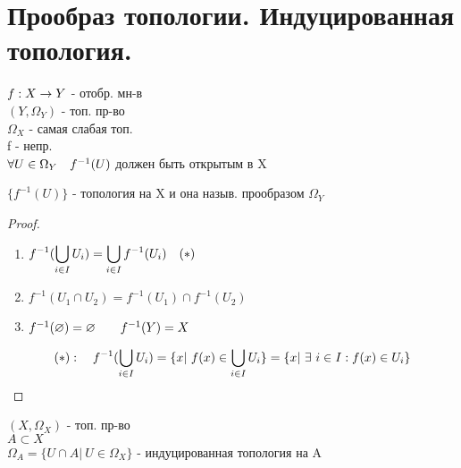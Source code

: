 \documentclass[geometry.tex]{subfiles}
\begin{document}
  \section{Прообраз топологии. Индуцированная топология.}

  \begin{definition}
      $f: X \rightarrow Y$ - отобр. мн-в\\
      $(Y, \Omega_Y)$ - топ. пр-во\\
      $\Omega_X$ - самая слабая топ.\\
      f - непр.\\
      $\forall U \in \Omega_Y \quad f^{-1}(U)$ должен быть открытым в X
  \end{definition}
  \begin{theorem}
      $\{f^{-1}(U)\}$ - топология на X и она назыв. прообразом $\Omega_Y$
  \end{theorem}

  \begin{proof}
      \begin{enumerate}
          \item $\displaystyle f^{-1}(\bigcup_{i \in I} U_i) = \bigcup_{i \in I} f^{-1}(U_i) \quad (*)$
          \item $f^{-1}(U_1 \cap U_2) = f^{-1}(U_1) \cap f^{-1}(U_2)$
          \item $f^{-1}(\varnothing) = \varnothing \quad\quad f^{-1}(Y) = X$
      \end{enumerate}
      \[(*): \quad f^{-1}(\bigcup_{i \in I} U_i) = \{x | \ f(x) \in \bigcup_{i \in I} U_i\} =
      \{x | \ \exists \  i \in I: f(x) \in U_i\}\]
  \end{proof}

  \begin{definition}
      $(X, \Omega_X)$ - топ. пр-во\\
      $A \subset X$\\
      $\Omega_A = \{U \cap A | \ U \in \Omega_X\}$ - индуцированная топология на A
  \end{definition}
\end{document}
